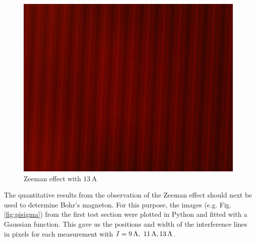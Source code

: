 \begin{figure}[ht]
\centering
\includegraphics[scale=.14]{images//interference.jpg}
\caption{Zeeman effect with $\SI{13}{\ampere}$}
\label{fig:interference}
\end{figure}
The quantitative results from the observation of the Zeeman effect should next be used to determine Bohr's magneton.
For this purpose, the images (e.g. Fig. \ref{fig:pisigma}) from the first test section were plotted in Python and fitted with a Gaussian function.
This gave us the positions and width of the interference lines in pixels for each measurement with $I =\SIlist{9;11;13}{\ampere}$.
